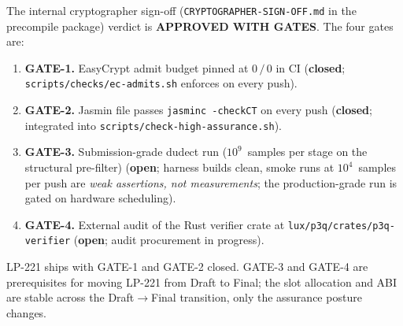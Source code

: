 The internal cryptographer sign-off
(\texttt{CRYPTOGRAPHER-SIGN-OFF.md} in the precompile package)
verdict is \textbf{APPROVED WITH GATES}. The four gates are:

\begin{enumerate}[leftmargin=2em,nosep]
\item \textbf{GATE-1.} EasyCrypt admit budget pinned at $0\,/\,0$ in
  CI (\textbf{closed}; \texttt{scripts/checks/ec-admits.sh} enforces
  on every push).
\item \textbf{GATE-2.} Jasmin file passes \texttt{jasminc -checkCT}
  on every push (\textbf{closed}; integrated into
  \texttt{scripts/check-high-assurance.sh}).
\item \textbf{GATE-3.} Submission-grade dudect run
  ($10^9$~samples per stage on the structural pre-filter)
  (\textbf{open}; harness builds clean, smoke runs at
  $10^4$~samples per push are \emph{weak assertions, not
  measurements}; the production-grade run is gated on hardware
  scheduling).
\item \textbf{GATE-4.} External audit of the Rust verifier crate at
  \texttt{lux/p3q/crates/p3q-verifier} (\textbf{open}; audit
  procurement in progress).
\end{enumerate}

LP-221 ships with GATE-1 and GATE-2 closed. GATE-3 and GATE-4 are
prerequisites for moving LP-221 from Draft to Final; the slot
allocation and ABI are stable across the Draft$\to$Final
transition, only the assurance posture changes.
